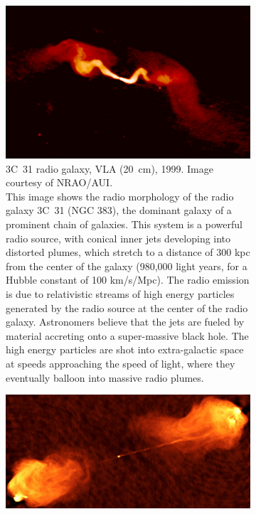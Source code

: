 \documentclass[10pt,a4paper,english]{article}
\begin{document}
\begin{figure}[!ht]
    \noindent
    \begin{subfigure}[t]{.495\textwidth}
        \includegraphics[width=\textwidth]{3c31lbcd_6in_hi.jpg}
        \caption{
            3C~31 radio galaxy, VLA (\SI{20}{\cm}), 1999.
            Image courtesy of NRAO/AUI.\vspace{1ex}\\
            This image shows the radio morphology of the radio galaxy 3C~31 (NGC
            383), the dominant galaxy of a prominent chain of galaxies. This
            system is a powerful radio source, with conical inner jets
            developing into distorted plumes, which stretch to a distance of
            300 kpc from the center of the galaxy (980,000 light years, for a
            Hubble constant of 100 km/s/Mpc). The radio emission is due to
            relativistic streams of high energy particles generated by the
            radio source at the center of the radio galaxy. Astronomers believe
            that the jets are fueled by material accreting onto a super-massive
            black hole. The high energy particles are shot into extra-galactic
            space at speeds approaching the speed of light, where they
            eventually balloon into massive radio plumes.
        }
    \end{subfigure}%
    \hfill
    \begin{subfigure}[t]{.495\textwidth}
        \includegraphics[width=\textwidth]{CygA-YellowOrange_hi.jpg}

\end{subfigure}
\end{figure}
\end{document}
